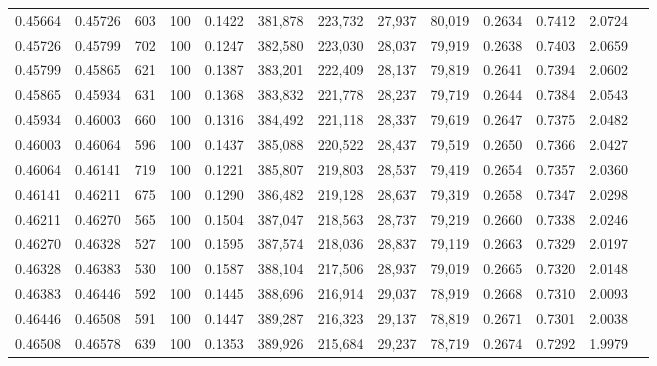 \begin{tabular}{rrrrrrrrrrrrr}
0.45664 & 0.45726 &   603 & 100 &                                     0.1422 & 381,878 & 223,732 &  27,937 &  80,019 & 0.2634 & 0.7412 & 2.0724 \\
0.45726 & 0.45799 &   702 & 100 &                                     0.1247 & 382,580 & 223,030 &  28,037 &  79,919 & 0.2638 & 0.7403 & 2.0659 \\
0.45799 & 0.45865 &   621 & 100 &                                     0.1387 & 383,201 & 222,409 &  28,137 &  79,819 & 0.2641 & 0.7394 & 2.0602 \\
0.45865 & 0.45934 &   631 & 100 &                                     0.1368 & 383,832 & 221,778 &  28,237 &  79,719 & 0.2644 & 0.7384 & 2.0543 \\
0.45934 & 0.46003 &   660 & 100 &                                     0.1316 & 384,492 & 221,118 &  28,337 &  79,619 & 0.2647 & 0.7375 & 2.0482 \\
0.46003 & 0.46064 &   596 & 100 &                                     0.1437 & 385,088 & 220,522 &  28,437 &  79,519 & 0.2650 & 0.7366 & 2.0427 \\
0.46064 & 0.46141 &   719 & 100 &                                     0.1221 & 385,807 & 219,803 &  28,537 &  79,419 & 0.2654 & 0.7357 & 2.0360 \\
0.46141 & 0.46211 &   675 & 100 &                                     0.1290 & 386,482 & 219,128 &  28,637 &  79,319 & 0.2658 & 0.7347 & 2.0298 \\
0.46211 & 0.46270 &   565 & 100 &                                     0.1504 & 387,047 & 218,563 &  28,737 &  79,219 & 0.2660 & 0.7338 & 2.0246 \\
0.46270 & 0.46328 &   527 & 100 &                                     0.1595 & 387,574 & 218,036 &  28,837 &  79,119 & 0.2663 & 0.7329 & 2.0197 \\
0.46328 & 0.46383 &   530 & 100 &                                     0.1587 & 388,104 & 217,506 &  28,937 &  79,019 & 0.2665 & 0.7320 & 2.0148 \\
0.46383 & 0.46446 &   592 & 100 &                                     0.1445 & 388,696 & 216,914 &  29,037 &  78,919 & 0.2668 & 0.7310 & 2.0093 \\
0.46446 & 0.46508 &   591 & 100 &                                     0.1447 & 389,287 & 216,323 &  29,137 &  78,819 & 0.2671 & 0.7301 & 2.0038 \\
0.46508 & 0.46578 &   639 & 100 &                                     0.1353 & 389,926 & 215,684 &  29,237 &  78,719 & 0.2674 & 0.7292 & 1.9979 \\

\end{tabular}
